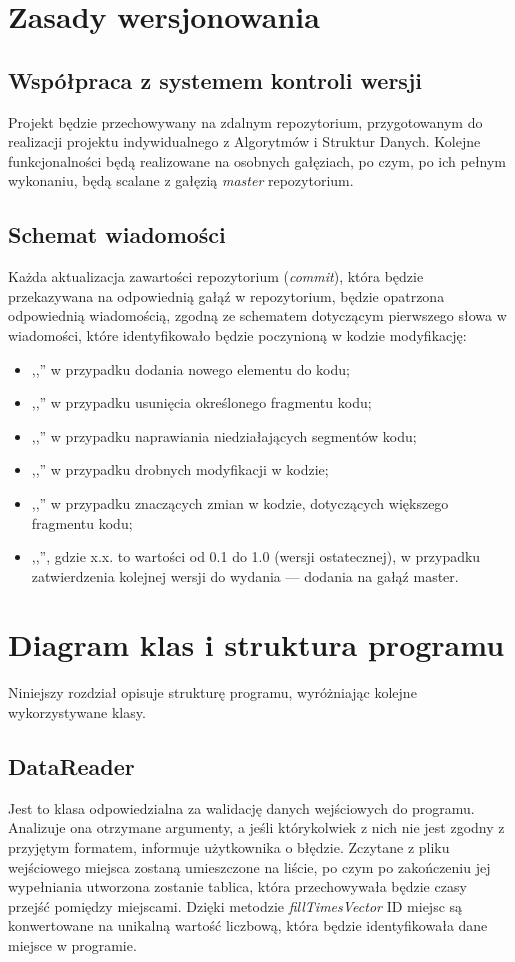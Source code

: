 \documentclass[12pt,a4paper]{article}
\begin{document}
\section{Zasady wersjonowania}
\subsection{Współpraca z systemem kontroli wersji}
Projekt będzie przechowywany na zdalnym repozytorium, przygotowanym do realizacji projektu indywidualnego z Algorytmów i Struktur Danych. Kolejne funkcjonalności będą realizowane na osobnych gałęziach, po czym, po ich pełnym wykonaniu, będą scalane z gałęzią \textsl{master} repozytorium.
\subsection{Schemat wiadomości}
Każda aktualizacja zawartości repozytorium (\textsl{commit}), która będzie przekazywana na odpowiednią gałąź w repozytorium, będzie opatrzona odpowiednią wiadomością, zgodną ze schematem dotyczącym pierwszego słowa w wiadomości, które identyfikowało będzie poczynioną w kodzie modyfikację:
\begin{itemize}
\item ,,'' w przypadku dodania nowego elementu do kodu;
\item ,,'' w przypadku usunięcia określonego fragmentu kodu;
\item ,,'' w przypadku naprawiania niedziałających segmentów kodu;
\item ,,'' w przypadku drobnych modyfikacji w kodzie;
\item ,,'' w przypadku znaczących zmian w kodzie, dotyczących większego fragmentu kodu;
\item ,,'', gdzie x.x. to wartości od 0.1 do 1.0 (wersji ostatecznej), w przypadku zatwierdzenia kolejnej wersji do wydania --- dodania na gałąź master.
\end{itemize}
\section{Diagram klas i struktura programu}
Niniejszy rozdział opisuje strukturę programu, wyróżniając kolejne wykorzystywane klasy.
\subsection{DataReader}
Jest to klasa odpowiedzialna za walidację danych wejściowych do programu. Analizuje ona otrzymane argumenty, a jeśli którykolwiek z nich nie jest zgodny z przyjętym formatem, informuje użytkownika o błędzie. Zczytane z pliku wejściowego miejsca zostaną umieszczone na liście, po czym po zakończeniu jej wypełniania utworzona zostanie tablica, która przechowywała będzie czasy przejść pomiędzy miejscami. Dzięki metodzie \textsl{fillTimesVector} ID miejsc są konwertowane na unikalną wartość liczbową, która będzie identyfikowała dane miejsce w programie.
\end{document}
